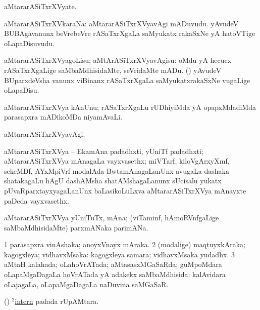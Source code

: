 \bentry
{}
\gl{\nA}
\bmng
aMtararASiTxrXVyate. 
\emng
\eentry

\bentry
{}
\gl{\nA}
\bmng
aMtararASiTxrXVkaraNa: 
\banum
{} aMtararASiTxrXVyavAgi mADuvudu. 
 yAvudeV BUBAgavanunx beVrebeVre rASaTxrXgaLa saMyukatx rakaSxNe yA hatoVTige oLapaDisuvudu. 
\eanum
\emng
\eentry

\bentry
{}
\gl{\sakirx}
\bmng
aMtararASiTxrXVyagoLisu; aMtArASiTxrXVyavAgisu: 
\banum
{} oMdu yA hecucx rASaTxrXgaLige saMbaMdhisidaMte, seVridaMte mADu. 
 (\kanmu) yAvudeV BUparxdeVsha \mo vanunx viBinanx rASaTxrXgaLa saMyukatxrakaSxNe \mo vugaLige oLapaDisu. 
\eanum
\emng
\eentry

\bentry
{}
\gl{\nA}
\bmng
aMtararASiTxrXVya kAnUnu; rASaTxrXgaLu rUDhiyiMda yA opapxMdadiMda parasapxra mADikoMDa niyamAvaLi. 
\emng
\eentry

\bentry
{}
\gl{\kirxvi}
\bmng
aMtararASiTxrXVyavAgi. 
\emng
\eentry

\bentry
{}
\gl{\nA}
\bmng
aMtararASiTxrXVya -- EkamAna padadhxti, yUniTf padadhxti; aMtararASiTxrXVya mAnagaLa vayxvasethx; miVTarf, kiloVgArxyXmf, sekeMDf, AYxMpiVrf modalAda BwtamAnagaLanUnx avugaLa dashaka shatakagaLu hAgU dashAMsha shatAMshagaLanunx sUcisalu yukatx pUvaRparxtayxyagaLanUnx baLasikoLuLxva aMtararASiTxrXVya mAnayxte paDeda vayxvasethx. 
\emng
\eentry

\bentry
{}
\gl{\nA}
\bmng
aMtararASiTxrXVya yUniTuTx, mAna; (viTaminf, hAmoRVnfgaLige saMbaMdhisidaMte) parxmANaka parimANa. 
\emng
\eentry

\bentry
{}
\gl{\gu}
\bmng
\bnum
\num{1} parasapxra vinAshaka; anoyxVnayx mAraka. 
\num{2} (modalige) maqtuyxkAraka; kagogxleya; vidhavxMsaka:  kagogxleya samara; vidhavxMsaka yudadhx. 
\num{3} aMtaH kalahada; oLahoVrATada; aMtasasxMGaSaRda; guMpoMdara oLapaMgaDagaLa hoVrATada yA adakekx saMbaMdhisida:  kalAvidara oLajagaLa, oLapaMgaDagaLa naDuvina saMGaSaR. 
\enum
\emng
\eentry

\bentry
{}
\gl{\nA}
\bmng
(\ame) \hyperlink{intern(2)}{$^2$intern} padada rUpAMtara. 
\emng
\eentry

